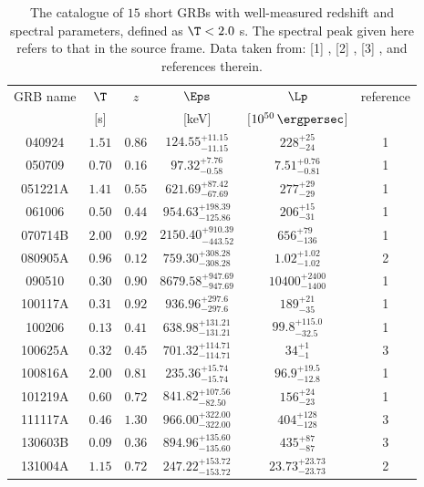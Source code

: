\begin{table}
\caption[Catalogue of short GRBs with both redshift and spectral parameters]{The catalogue of $15$ short GRBs with well-measured redshift and spectral parameters, defined as $\T < 2.0$ s. The spectral peak given here refers to that in the source frame. Data taken from: [1] , [2] \cite{Paul-2018-MNRAS--long}, [3] , and references therein.}
\label{tab:short_catalogue}
\begin{center}
\begin{tabular}{|c|c|c|c|c|c|}
\hline
GRB name & $\T$ & $z$ & $\Eps$ & $\Lp$ & reference \\
 & [s] &  & [keV] & [$10^{50} \, \ergpersec$] & \\
\hline
\hline
040924 & $1.51$ & $0.86$ & ${124.55}^{+11.15}_{-11.15}$ & $228^{+25}_{-24}$ & 1 \\
\hline
050709 & $0.70$ & $0.16$ & ${97.32}^{+7.76}_{-0.58}$ & $7.51^{+0.76}_{-0.81}$ & 1 \\
\hline
051221A & $1.41$ & $0.55$ & ${621.69}^{+87.42}_{-67.69}$ & $277^{+29}_{-29}$ & 1 \\
\hline
061006 & $0.50$ & $0.44$ & ${954.63}^{+198.39}_{-125.86}$ & $206^{+15}_{-31}$ & 1 \\
\hline
070714B & $2.00$ & $0.92$ & ${2150.40}^{+910.39}_{-443.52}$ & $656^{+79}_{-136}$ & 1 \\
\hline
080905A & $0.96$ & $0.12$ & ${759.30}^{+308.28}_{-308.28}$ & $1.02^{+1.02}_{-1.02}$ & 2 \\
\hline
090510 & $0.30$ & $0.90$ & ${8679.58}^{+947.69}_{-947.69}$ & $10400^{+2400}_{-1400}$ & 1 \\
\hline
100117A & $0.31$ & $0.92$ & ${936.96}^{+297.6}_{-297.6}$ & $189^{+21}_{-35}$ & 1 \\
\hline
100206 & $0.13$ & $0.41$ & ${638.98}^{+131.21}_{-131.21}$ & $99.8^{+115.0}_{-32.5}$ & 1 \\
\hline
100625A & $0.32$ & $0.45$ & ${701.32}^{+114.71}_{-114.71}$ & $34^{+1}_{-1}$ & 3 \\
\hline
100816A & $2.00$ & $0.81$ & ${235.36}^{+15.74}_{-15.74}$ & $96.9^{+19.5}_{-12.8}$ & 1 \\
\hline
101219A & $0.60$ & $0.72$ & ${841.82}^{+107.56}_{-82.50}$ & $156^{+24}_{-23}$ & 1 \\
\hline
111117A & $0.46$ & $1.30$ & ${966.00}^{+322.00}_{-322.00}$ & $404^{+128}_{-128}$ & 3 \\
\hline
130603B & $0.09$ & $0.36$ & ${894.96}^{+135.60}_{-135.60}$ & $435^{+87}_{-87}$ & 3 \\
\hline
131004A & $1.15$ & $0.72$ & ${247.22}^{+153.72}_{-153.72}$ & $23.73^{+23.73}_{-23.73}$ & 2 \\
\hline
\end{tabular}
\end{center}
\end{table}

